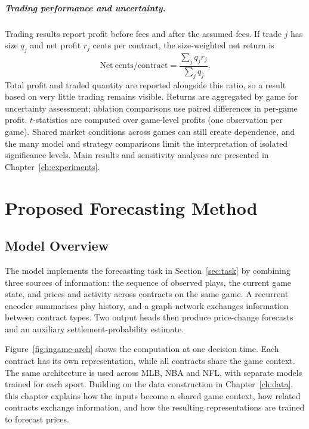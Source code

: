 \documentclass[12pt,a4paper,oneside]{report}
\begin{document}
\paragraph{Trading performance and uncertainty.}
Trading results report profit before fees and after the assumed fees. If trade $j$ has size $q_j$ and net profit $r_j$ cents per contract,
the size-weighted net return is
\begin{equation}
 \mathrm{Net\ cents/contract}=\frac{\sum_j q_j r_j}{\sum_j q_j}.
\end{equation}
Total profit and traded quantity are reported alongside this ratio, so a result
based on very little trading remains visible. Returns are aggregated by game
for uncertainty assessment; ablation comparisons use paired differences in
per-game profit. $t$-statistics are computed over game-level profits (one observation 
per game). Shared market conditions across games can still create dependence, and 
the many model and strategy comparisons limit the interpretation of isolated 
significance levels. Main results and sensitivity analyses are presented in 
Chapter~\ref{ch:experiments}.

\chapter{Proposed Forecasting Method}
\label{ch:ingame}
\section{Model Overview}
The model implements the forecasting task in Section~\ref{sec:task} by combining
three sources of information: the sequence of observed plays, the current game
state, and prices and activity across contracts on the same game. A recurrent
encoder summarises play history, and a graph network exchanges information
between contract types. Two output heads then produce price-change forecasts
and an auxiliary settlement-probability estimate.

Figure~\ref{fig:ingame-arch} shows the computation at one decision time. Each
contract has its own representation, while all contracts share the game context.
The same architecture is used across MLB, NBA and NFL, with separate models
trained for each sport. Building on the data construction in
Chapter~\ref{ch:data}, this chapter explains how the inputs become a shared game
context, how related contracts exchange information, and how the resulting
representations are trained to forecast prices.
\end{document}
